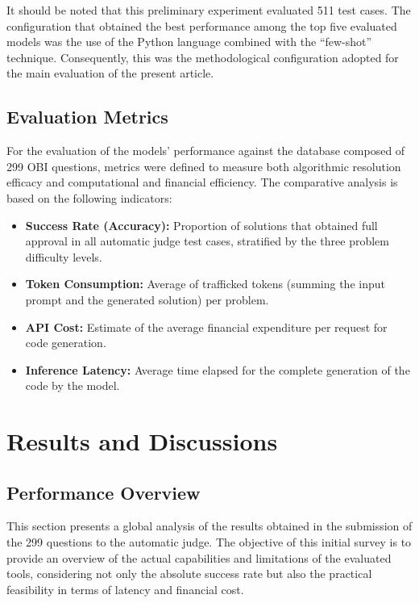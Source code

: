 \documentclass[conference]{IEEEtran}
\begin{document}
It should be noted that this preliminary experiment evaluated 511 test cases. The configuration that obtained the best performance among the top five evaluated models was the use of the Python language combined with the ``few-shot'' technique. Consequently, this was the methodological configuration adopted for the main evaluation of the present article.

\subsection{Evaluation Metrics}\label{subsec:metrics}

For the evaluation of the models' performance against the database composed of 299 OBI questions, metrics were defined to measure both algorithmic resolution efficacy and computational and financial efficiency. The comparative analysis is based on the following indicators:

\begin{itemize}
    \item \textbf{Success Rate (Accuracy):} Proportion of solutions that obtained full approval in all automatic judge test cases, stratified by the three problem difficulty levels.
    \item \textbf{Token Consumption:} Average of trafficked tokens (summing the input prompt and the generated solution) per problem.
    \item \textbf{API Cost:} Estimate of the average financial expenditure per request for code generation.
    \item \textbf{Inference Latency:} Average time elapsed for the complete generation of the code by the model.
\end{itemize}

\section{Results and Discussions}\label{sec:results}

\subsection{Performance Overview}\label{subsec:perf_overview}

This section presents a global analysis of the results obtained in the submission of the 299 questions to the automatic judge. The objective of this initial survey is to provide an overview of the actual capabilities and limitations of the evaluated tools, considering not only the absolute success rate but also the practical feasibility in terms of latency and financial cost.
\end{document}
